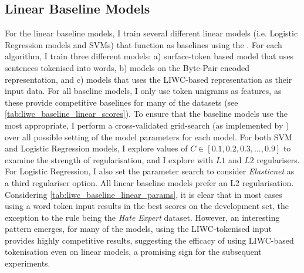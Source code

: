 \subsection{Linear Baseline Models}\label{sec:baseline_models}

For the linear baseline models, I train several different linear models (i.e. Logistic Regression models and SVMs) that function as baselines using the \citet{Pedregosa:2015}. For each algorithm, I train three different models: a) surface-token based model that uses sentences tokenised into words, b) models on the Byte-Pair encoded representation, and c) models that uses the LIWC-based representation as their input data. For all baseline models, I only use token unigrams as features, as these provide competitive baselines for many of the datasets (see \autoref{tab:liwc_baseline_linear_scores}). To ensure that the baseline models use the most appropriate, I perform a cross-validated grid-search (as implemented by \citet{Pedregosa:2015}) over all possible setting of the model parameters for each model. For both SVM and Logistic Regression models, I explore values of $C\in [0.1, 0.2, 0.3, \ldots, 0.9]$ to examine the strength of regularisation, and I explore with $L1$ and $L2$ regularisers. For Logistic Regression, I also set the parameter search to consider \textit{Elasticnet} as a third regulariser option.
All linear baseline models prefer an L2 regularisation. Considering \cref{tab:liwc_baseline_linear_params}, it is clear that in most cases using a word token input results in the best scores on the development set, the exception to the rule being the \textit{Hate Expert} dataset. However, an interesting pattern emerges, for many of the models, using the LIWC-tokenised input provides highly competitive results, suggesting the efficacy of using LIWC-based tokenisation even on linear models, a promising sign for the subsequent experiments.

